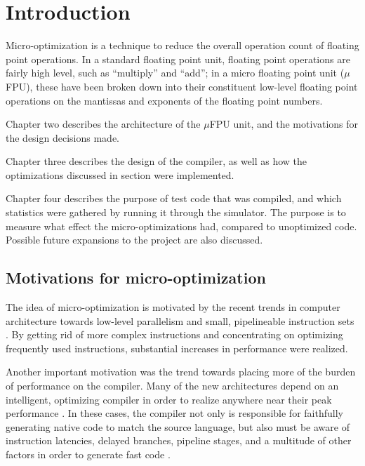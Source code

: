 
\chapter{Introduction}


Micro-optimization is a technique to reduce the overall operation count of
floating point operations.  In a standard floating point unit, floating
point operations are fairly high level, such as ``multiply'' and ``add'';
in a micro floating point unit ($\mu$FPU), these have been broken down into
their constituent low-level floating point operations on the mantissas and
exponents of the floating point numbers.

Chapter two describes the architecture of the $\mu$FPU unit, and the
motivations for the design decisions made.

Chapter three describes the design of the compiler, as well as how the
optimizations discussed in section were implemented.

Chapter four describes the purpose of test code that was compiled, and which
statistics were gathered by running it through the simulator.  The purpose
is to measure what effect the micro-optimizations had, compared to
unoptimized code.  Possible future expansions to the project are also
discussed.

\section{Motivations for micro-optimization}

The idea of micro-optimization is motivated by the recent trends in computer
architecture towards low-level parallelism and small, pipelineable
instruction sets \cite{misc-full,inbook-full}.  By getting rid of more
complex instructions and concentrating on optimizing frequently used
instructions, substantial increases in performance were realized.

Another important motivation was the trend towards placing more of the
burden of performance on the compiler.  Many of the new architectures depend
on an intelligent, optimizing compiler in order to realize anywhere near
their peak performance
\cite{article-full,mastersthesis-full,unpublished-full}.  In these cases, the
compiler not only is responsible for faithfully generating native code to
match the source language, but also must be aware of instruction latencies,
delayed branches, pipeline stages, and a multitude of other factors in order
to generate fast code \cite{article-full}.

